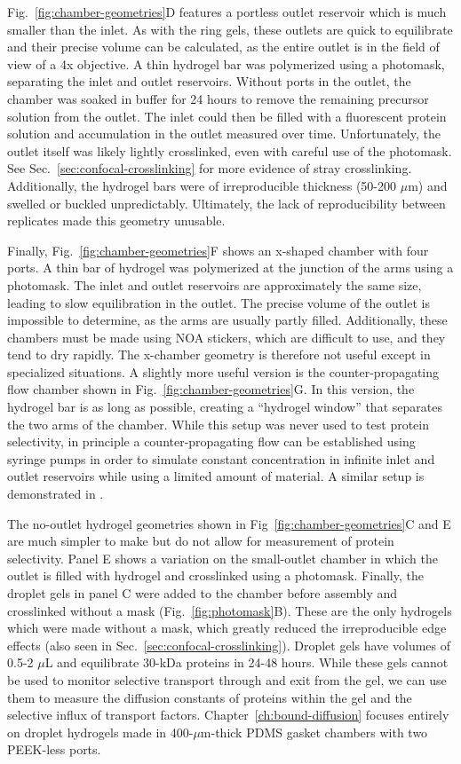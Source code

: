 Fig.~\ref{fig:chamber-geometries}D features a portless outlet reservoir which is much smaller than the inlet.  As with the ring gels, these outlets are quick to equilibrate and their precise volume can be calculated, as the entire outlet is in the field of view of a 4x objective.  A thin hydrogel bar was polymerized using a photomask, separating the inlet and outlet reservoirs.  Without ports in the outlet, the chamber was soaked in buffer for 24 hours to remove the remaining precursor solution from the outlet.  The inlet could then be filled with a fluorescent protein solution and accumulation in the outlet measured over time.  Unfortunately, the outlet itself was likely lightly crosslinked, even with careful use of the photomask.  See Sec.~\ref{sec:confocal-crosslinking} for more evidence of stray crosslinking.  Additionally, the hydrogel bars were of irreproducible thickness (50-200 $\mu$m) and swelled or buckled unpredictably.  Ultimately, the lack of reproducibility between replicates made this geometry unusable.

Finally, Fig.~\ref{fig:chamber-geometries}F shows an x-shaped chamber with four ports.  A thin bar of hydrogel was polymerized at the junction of the arms using a photomask.  The inlet and outlet reservoirs are approximately the same size, leading to slow equilibration in the outlet.  The precise volume of the outlet is impossible to determine, as the arms are usually partly filled.  Additionally, these chambers must be made using NOA stickers, which are difficult to use, and they tend to dry rapidly.  The x-chamber geometry is therefore not useful except in specialized situations.  A slightly more useful version is the counter-propagating flow chamber shown in Fig.~\ref{fig:chamber-geometries}G.  In this version, the hydrogel bar is as long as possible, creating a ``hydrogel window'' that separates the two arms of the chamber.  While this setup was never used to test protein selectivity, in principle a counter-propagating flow can be established using syringe pumps in order to simulate constant concentration in infinite inlet and outlet reservoirs while using a limited amount of material. A similar setup is demonstrated in \cite{paustian13}.

The no-outlet hydrogel geometries shown in Fig~\ref{fig:chamber-geometries}C and E are much simpler to make but do not allow for measurement of protein selectivity.  Panel E shows a variation on the small-outlet chamber in which the outlet is filled with hydrogel and crosslinked using a photomask. Finally, the droplet gels in panel C were added to the chamber before assembly and crosslinked without a mask (Fig.~\ref{fig:photomask}B).  These are the only hydrogels which were made without a mask, which greatly reduced the irreproducible edge effects (also seen in Sec.~\ref{sec:confocal-crosslinking}).  Droplet gels have volumes of 0.5-2 $\mu$L and equilibrate 30-kDa proteins in 24-48 hours.  While these gels cannot be used to monitor selective transport through and exit from the gel, we can use them to measure the diffusion constants of proteins within the gel and the selective influx of transport factors.  Chapter~\ref{ch:bound-diffusion} focuses entirely on droplet hydrogels made in 400-$\mu$m-thick PDMS gasket chambers with two PEEK-less ports.

